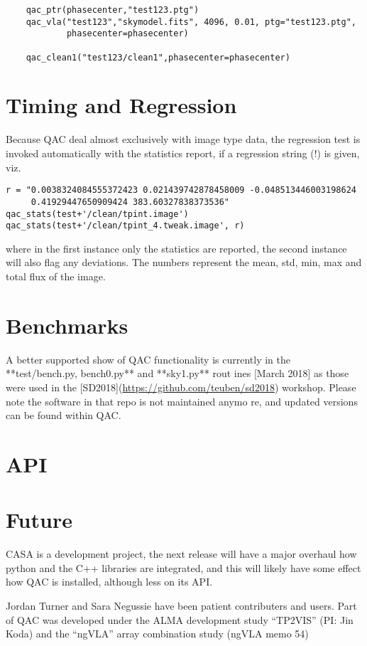\documentclass[11pt,twoside]{article}
\begin{document}
\footnotesize
\begin{verbatim}
    qac_ptr(phasecenter,"test123.ptg")
    qac_vla("test123","skymodel.fits", 4096, 0.01, ptg="test123.ptg",
            phasecenter=phasecenter)
            
    qac_clean1("test123/clean1",phasecenter=phasecenter)
\end{verbatim}
\normalsize

\section{Timing and Regression}

Because QAC deal almost exclusively with image type data, the regression test is invoked automatically
with the statistics report, if a regression string (!) is given, viz.

\footnotesize
\begin{verbatim}
r = "0.0038324084555372423 0.021439742878458009 -0.048513446003198624
     0.41929447650909424 383.60327838373536"
qac_stats(test+'/clean/tpint.image')
qac_stats(test+'/clean/tpint_4.tweak.image', r)
\end{verbatim}
\normalsize

where in the first instance only the statistics are reported, the second instance will also flag any deviations.
The numbers represent the mean, std, min, max and total flux of the image.

\section{Benchmarks}

A better supported show of QAC functionality is currently in the **test/bench.py, bench0.py** and **sky1.py** rout
ines [March 2018] as those were used in the
[SD2018](\url{https://github.com/teuben/sd2018}) workshop. Please note the software in that repo is not maintained anymo
re, and updated versions can be found
within QAC.

\section{API}




\section{Future}

CASA is a development project, the next
release will have a major overhaul how python and the C++ libraries
are integrated, and this will likely have some effect how QAC is
installed, although less on its API. 

\acknowledgements Jordan Turner and Sara Negussie have been patient contributers and users.
Part of QAC was developed under the ALMA development study ``TP2VIS''  (PI: Jin Koda) and
the ``ngVLA'' array combination study (ngVLA memo 54)


\end{document}
